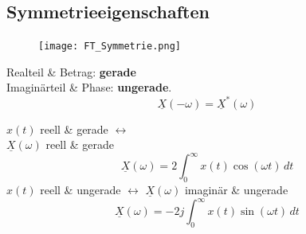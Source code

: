 \begin{multicols*}{2}
\subsection{Symmetrieeigenschaften}
\begin{mdframed}[style=exercise, nobreak=true]
	\begin{figure}
		\vspace{-1.4em}
		\texttt{[image: FT\_Symmetrie.png]}
	\end{figure}
	\setlength{\parindent}{0pt}
	Realteil \& Betrag: \textbf{gerade}\\
	Imaginärteil \& Phase: \textbf{ungerade}.
	\[
	\underline{X}(-\omega) = \underline{X}^*(\omega)
	\]
	
	$x(t)$ reell \& gerade $\leftrightarrow$\\ $\underline{X}(\omega)$  reell \& gerade
	$$\underline{X}(\omega) = 2\int_0^\infty x(t)\cos(\omega t)\,dt$$
	$x(t)$ reell \& ungerade $\leftrightarrow$ $\underline{X}(\omega)$ imaginär \& ungerade
	$$\underline{X}(\omega) = -2j\int_0^\infty x(t)\sin(\omega t)\,dt$$
\end{mdframed}


\end{multicols*}
